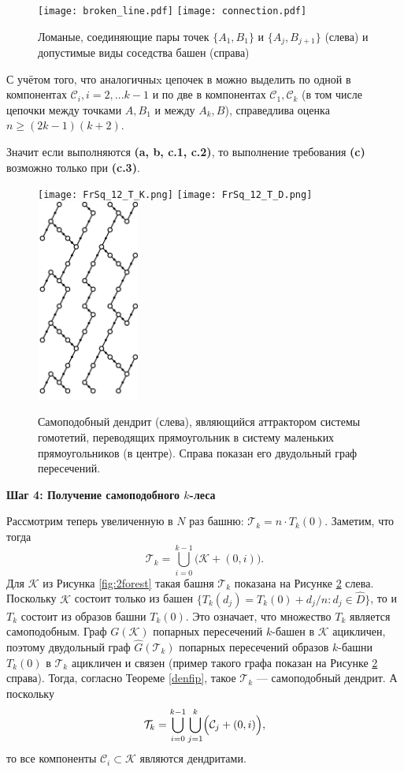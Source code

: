 \begin{figure}[h]
\texttt{[image: broken\_line.pdf]}
\hfill
\texttt{[image: connection.pdf]}
\caption{Ломаные, соединяющие пары точек $\{A_1, B_1\}$ и $\{A_j, B_{j+1}\}$ (слева) и допустимые виды соседства башен (справа)}
\label{fig:brokenline}
\end{figure}

С учётом того, что аналогичныx цепочек в можно выделить по одной в компонентах ${\mathcal{C}}_i, i=2,...k-1$ и по две в компонентах ${\mathcal{C}}_1, {\mathcal{C}}_k$ (в том числе цепочки между точками $A, B_1$ и между $A_k, B$), справедлива оценка $n\geq(2k-1)(k+2)$.

Значит если выполняются {\bf(a, b, c.1, c.2)}, то выполнение требования {\bf(c)} возможно только при {\bf(c.3)}.\\

\begin{figure}[h]
\texttt{[image: FrSq\_12\_T\_K.png]}
\hfill
\texttt{[image: FrSq\_12\_T\_D.png]}
\hfill
\includegraphics[width=0.3\textwidth]{images/img3/BIG.pdf}
\caption{Самоподобный дендрит (слева), являющийся аттрактором системы гомотетий, переводящих прямоугольник в систему маленьких прямоугольников (в центре). Справа показан его двудольный граф пересечений.}
\label{fig:2tower}
\end{figure}


\textbf{Шаг 4: Получение самоподобного $k$-леса}

Рассмотрим теперь увеличенную в $N$ раз башню: 
$\mathcal{T}_k=n\cdot T_k(0).$
Заметим, что тогда 
$$\mathcal{T}_k=\bigcup\limits_{i=0}^{k-1}\bigl({\mathcal{K}}+(0,i)\bigr).$$
Для ${\mathcal{K}}$ из Рисунка \ref{fig:2forest} такая башня $\mathcal{T}_k$ показана на Рисунке \ref{fig:2tower} слева.
Поскольку ${\mathcal{K}}$ состоит только из башен $\{T_k(d_j)=T_k(0)+d_j/n : d_j\in\hat D\}$, то и $T_k$ состоит из образов башни $T_k(0)$.
Это означает, что множество $T_k$ является самоподобным.
Граф $G({\mathcal{K}})$ попарных пересечений $k$-башен в ${\mathcal{K}}$ ацикличен, поэтому двудольный граф $\hat G(\mathcal{T}_k)$ попарных пересечений образов $k$-башни $T_k(0)$ в $\mathcal{T}_k$ ацикличен и связен (пример такого графа показан на Рисунке \ref{fig:2tower} справа).
Тогда, согласно Теореме \ref{denfip}, такое $\mathcal{T}_k$ --- самоподобный дендрит.
А поскольку 
$$\mathcal{T}_k=\bigcup_{i=0}^{k-1}\bigcup_{j=1}^k\Bigl({\mathcal{C}}_j+(0,i)\Bigr),$$ то все компоненты ${\mathcal{C}}_i\subset{\mathcal{K}}$ являются дендритами.

